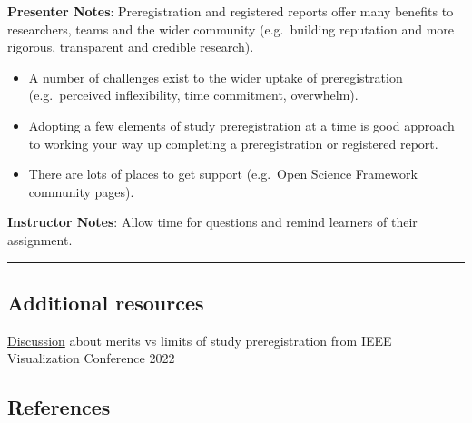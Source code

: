 \documentclass[
  letterpaper,
  DIV=11,
  numbers=noendperiod]{scrartcl}
\begin{document}
\textbf{Presenter Notes}: Preregistration and registered reports offer
many benefits to researchers, teams and the wider community
(e.g.~building reputation and more rigorous, transparent and credible
research).

\begin{itemize}
\item
  A number of challenges exist to the wider uptake of preregistration
  (e.g.~perceived inflexibility, time commitment, overwhelm).
\item
  Adopting a few elements of study preregistration at a time is good
  approach to working your way up completing a preregistration or
  registered report.
\item
  There are lots of places to get support (e.g.~Open Science Framework
  community pages).
\end{itemize}

\textbf{Instructor Notes}: Allow time for questions and remind learners
of their assignment.

\begin{center}\rule{0.5\linewidth}{0.5pt}\end{center}

\subsection{Additional resources}\label{additional-resources}

\href{https://www.youtube.com/watch?v=77YeUe_Bkco}{Discussion} about
merits vs limits of study preregistration from IEEE Visualization
Conference 2022

\subsection{References}\label{references}
\end{document}
